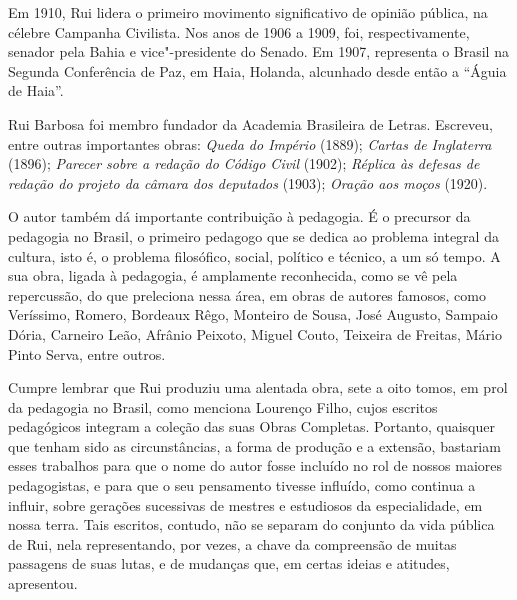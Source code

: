 Em 1910, Rui lidera o primeiro movimento significativo de opinião
pública, na célebre Campanha Civilista. Nos anos de 1906 a 1909, foi,
respectivamente, senador pela Bahia e vice"-presidente do Senado. Em
1907, representa o Brasil na Segunda Conferência de Paz, em Haia,
Holanda, alcunhado desde então a ``Águia de Haia''.

Rui Barbosa foi membro fundador da Academia Brasileira de Letras.
Escreveu, entre outras importantes obras: \textit{Queda do Império} (1889);
\textit{Cartas de Inglaterra} (1896); \textit{Parecer sobre a redação do Código Civil}
(1902); \textit{Réplica às defesas de redação do projeto da câmara dos
deputados} (1903); \textit{Oração aos moços} (1920).

O autor também dá importante contribuição à pedagogia. É o precursor
da pedagogia no Brasil, o primeiro pedagogo que se dedica ao problema
integral da cultura, isto é, o problema filosófico, social, político e
técnico, a um só tempo. A sua obra, ligada à pedagogia, é amplamente
reconhecida, como se vê pela repercussão, do que preleciona nessa
área, em obras de autores famosos, como Veríssimo, Romero, Bordeaux
Rêgo, Monteiro de Sousa, José Augusto, Sampaio Dória, Carneiro Leão,
Afrânio Peixoto, Miguel Couto, Teixeira de Freitas, Mário Pinto Serva,
entre outros. 

Cumpre lembrar que Rui produziu uma alentada obra, sete a oito tomos, em
prol da pedagogia no Brasil, como menciona Lourenço Filho, cujos
escritos pedagógicos integram a coleção das suas Obras Completas.
Portanto, quaisquer que tenham sido as circunstâncias, a forma de
produção e a extensão, bastariam esses trabalhos para que o nome do
autor fosse incluído no rol de nossos maiores pedagogistas, e para que
o seu pensamento tivesse influído, como continua a influir, sobre
gerações sucessivas de mestres e estudiosos da especialidade, em nossa
terra. Tais escritos, contudo, não se separam do conjunto da vida
pública de Rui, nela representando, por vezes, a chave da compreensão
de muitas passagens de suas lutas, e de mudanças que, em certas ideias
e atitudes, apresentou.

